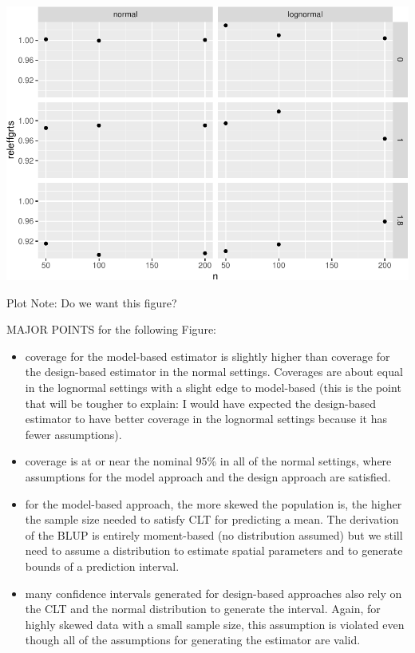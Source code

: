 \documentclass[]{elsarticle} %
\providecommand{\tightlist}{%
  \setlength{\itemsep}{0pt}\setlength{\parskip}{0pt}}
\begin{document}
\includegraphics{SpatialDVM_Manuscript_files/figure-latex/unnamed-chunk-6-1.pdf}

Plot Note: Do we want this figure?

MAJOR POINTS for the following Figure:

\begin{itemize}
\tightlist
\item
  coverage for the model-based estimator is slightly higher than
  coverage for the design-based estimator in the normal settings.
  Coverages are about equal in the lognormal settings with a slight edge
  to model-based (this is the point that will be tougher to explain: I
  would have expected the design-based estimator to have better coverage
  in the lognormal settings because it has fewer assumptions).
\item
  coverage is at or near the nominal 95\% in all of the normal settings,
  where assumptions for the model approach and the design approach are
  satisfied.
\item
  for the model-based approach, the more skewed the population is, the
  higher the sample size needed to satisfy CLT for predicting a mean.
  The derivation of the BLUP is entirely moment-based (no distribution
  assumed) but we still need to assume a distribution to estimate
  spatial parameters and to generate bounds of a prediction interval.
\item
  many confidence intervals generated for design-based approaches also
  rely on the CLT and the normal distribution to generate the interval.
  Again, for highly skewed data with a small sample size, this
  assumption is violated even though all of the assumptions for
  generating the estimator are valid.
\end{itemize}
\end{document}
